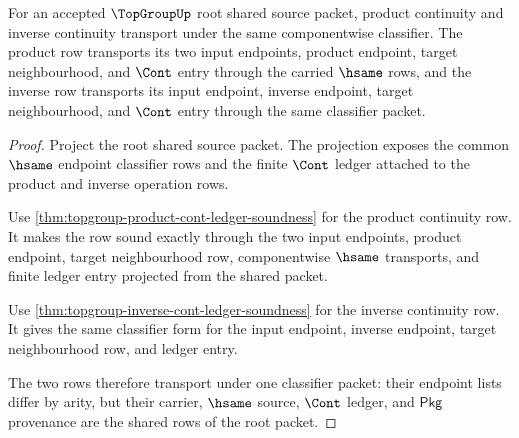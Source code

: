 \begin{theorem}
\label{thm:topgroup-root-continuity-classifier-stability}
For an accepted $\TopGroupUp$ root shared source packet, product continuity
and inverse continuity transport under the same componentwise classifier. The
product row transports its two input endpoints, product endpoint, target
neighbourhood, and $\Cont$ entry through the carried $\hsame$ rows, and the
inverse row transports its input endpoint, inverse endpoint, target
neighbourhood, and $\Cont$ entry through the same classifier packet.
\end{theorem}
\begin{proof}
Project the root shared source packet. The projection exposes the common
$\hsame$ endpoint classifier rows and the finite $\Cont$ ledger attached to
the product and inverse operation rows.

Use \autoref{thm:topgroup-product-cont-ledger-soundness} for the product
continuity row. It makes the row sound exactly through the two input
endpoints, product endpoint, target neighbourhood row, componentwise
$\hsame$ transports, and finite ledger entry projected from the shared packet.

Use \autoref{thm:topgroup-inverse-cont-ledger-soundness} for the inverse
continuity row. It gives the same classifier form for the input endpoint,
inverse endpoint, target neighbourhood row, and ledger entry.

The two rows therefore transport under one classifier packet: their endpoint
lists differ by arity, but their carrier, $\hsame$ source, $\Cont$ ledger, and
$\mathsf{Pkg}$ provenance are the shared rows of the root packet.
\end{proof}


